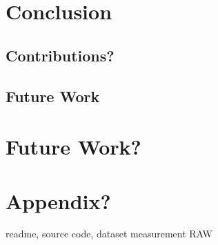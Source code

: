 \documentclass[USenglish]{uit-thesis}
\begin{document}
\chapter{Conclusion}
\section{Contributions?}
\section{Future Work}

\chapter{Future Work?}

\chapter{Appendix?}
readme, source code, dataset measurement RAW
\backmatter



\newpage{}
\end{document}
